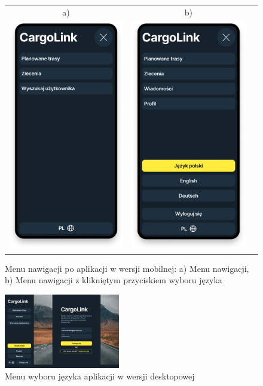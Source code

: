 \begin{figure}[H]
	\centering
        \begin{tabular}{@{}ccc@{}}
            a) & b)\\
		\includegraphics[width=0.3\linewidth]{rozdzial1/menu_m.png} &
		\includegraphics[width=0.3\linewidth]{rozdzial1/menu_język_m.png}
		\end{tabular}
	\caption{Menu nawigacji po aplikacji w wersji mobilnej: a) Menu nawigacji, b) Menu nawigacji z klikniętym przyciskiem wyboru języka}
	\label{Rys. fig:Menu nawigacji po aplikacji - ab}
\end{figure}
\begin{figure}[H]
 \centering
  \includegraphics[width=0.45\textwidth]{rozdzial1/menu_jezyk_d.jpg}
 \caption{Menu wyboru języka aplikacji w wersji desktopowej}
 \label{Rys. fig:Wybór języka aplikacji - desktop}
\end{figure}

